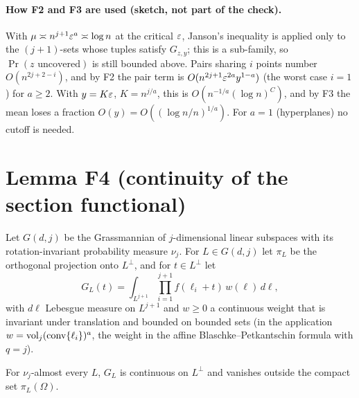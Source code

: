 \documentclass[11pt]{article}
\begin{document}
\paragraph{How F2 and F3 are used (sketch, not part of the check).} With $\mu\asymp n^{j+1}\varepsilon^a\asymp\log n$ at the critical
$\varepsilon$, Janson's inequality is applied only to the $(j+1)$-sets whose tuples satisfy $G_{z,y}$; this is a sub-family, so
$\Pr(z\text{ uncovered})$ is still bounded above. Pairs sharing $i$ points number $O(n^{2j+2-i})$, and by F2 the pair term is
$O(n^{2j+1}\varepsilon^{2a}y^{1-a})$ (the worst case $i=1$) for $a\ge2$. With $y=K\varepsilon$, $K=n^{j/a}$, this is
$O(n^{-1/a}(\log n)^{C})$, and by F3 the mean loses a fraction $O(y)=O((\log n/n)^{1/a})$. For $a=1$ (hyperplanes) no cutoff
is needed.

\section*{Lemma F4 (continuity of the section functional)}

Let $G(d,j)$ be the Grassmannian of $j$-dimensional linear subspaces with its rotation-invariant probability measure
$\nu_j$. For $L\in G(d,j)$ let $\pi_L$ be the orthogonal projection onto $L^\perp$, and for $t\in L^\perp$ let
\[
  G_L(t)=\int_{L^{j+1}}\prod_{i=1}^{j+1}f(\ell_i+t)\,w(\ell)\,d\ell ,
\]
with $d\ell$ Lebesgue measure on $L^{j+1}$ and $w\ge0$ a continuous weight that is invariant under translation and bounded on
bounded sets (in the application $w=\operatorname{vol}_j(\operatorname{conv}\{\ell_i\})^{a}$, the weight in the affine Blaschke--Petkantschin formula
\cite[Theorem~7.2.7]{SW} with $q=j$).

\begin{lemma}\label{F4}
For $\nu_j$-almost every $L$, $G_L$ is continuous on $L^\perp$ and vanishes outside the compact set $\pi_L(\Omega)$.
\end{lemma}
\end{document}
